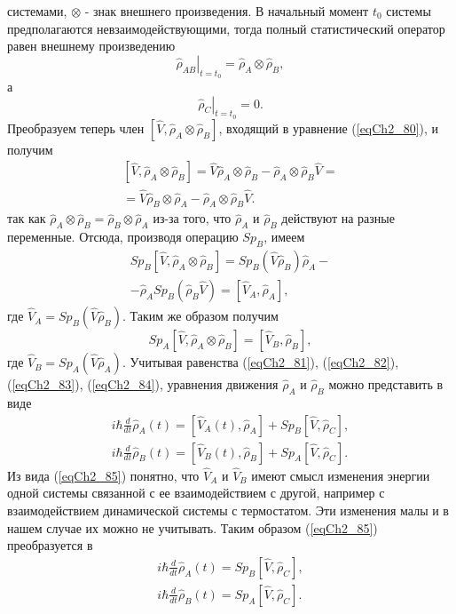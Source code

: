 системами, $\otimes$ - знак внешнего произведения. В начальный момент $t_0$
системы предполагаются  невзаимодействующими, тогда полный
статистический оператор равен внешнему произведению 
\[
\left.\hat{\rho}_{AB}\right|_{t = t_0} = \hat{\rho}_{A} \otimes \hat{\rho}_{B},
\] 
а 
\[
\left.\hat{\rho}_{C}\right|_{t = t_0} = 0.
\] 
Преобразуем теперь член 
$\left[\hat{V}, \hat{\rho}_{A} \otimes \hat{\rho}_{B}\right]$,
входящий в уравнение (\ref{eqCh2_80}), и получим  
\begin{eqnarray}
\left[\hat{V}, \hat{\rho}_{A} \otimes \hat{\rho}_{B}\right] = 
\hat{V}  \hat{\rho}_{A} \otimes \hat{\rho}_{B} - 
\hat{\rho}_{A} \otimes \hat{\rho}_{B} \hat{V} = 
\nonumber \\
= \hat{V}  \hat{\rho}_{B} \otimes \hat{\rho}_{A} - 
\hat{\rho}_{A} \otimes \hat{\rho}_{B} \hat{V}.
\label{eqCh2_82}
\end{eqnarray}
так как 
\(
\hat{\rho}_{A} \otimes \hat{\rho}_{B} = 
\hat{\rho}_{B} \otimes \hat{\rho}_{A}
\)   из-за того, что  $\hat{\rho}_{A}$ и $\hat{\rho}_{B}$ действуют на
разные  переменные. Отсюда, производя операцию $Sp_B$, имеем 
\begin{eqnarray}
Sp_B \left[\hat{V}, \hat{\rho}_{A} \otimes \hat{\rho}_{B}\right] = 
Sp_B\left(\hat{V} \hat{\rho}_{B}\right) \hat{\rho}_{A} - 
\nonumber \\
-
\hat{\rho}_{A} Sp_B \left(\hat{\rho}_{B} \hat{V}\right) = 
\left[\hat{V}_A, \hat{\rho}_A\right],
\label{eqCh2_83}
\end{eqnarray}
где $\hat{V}_A = Sp_B\left(\hat{V}\hat{\rho}_B\right)$. Таким же
образом получим 
\begin{equation}
Sp_A \left[\hat{V}, \hat{\rho}_{A} \otimes \hat{\rho}_{B}\right] =
\left[\hat{V}_B, \hat{\rho}_B\right],
\label{eqCh2_84}
\end{equation}
где $\hat{V}_B= Sp_A\left(\hat{V}\hat{\rho}_A\right)$.  
Учитывая равенства (\ref{eqCh2_81}), (\ref{eqCh2_82}),
(\ref{eqCh2_83}), (\ref{eqCh2_84}), уравнения движения 
$\hat{\rho}_{A}$ и $\hat{\rho}_{B}$ можно представить в виде  
\begin{eqnarray}
i\hbar\frac{d}{d t} \hat{\rho}_A\left(t\right) = 
\left[\hat{V}_A\left(t\right), \hat{\rho}_A\right] +
Sp_B \left[\hat{V}, \hat{\rho}_C\right],
\nonumber \\
i\hbar\frac{d}{d t} \hat{\rho}_B\left(t\right) = 
\left[\hat{V}_B\left(t\right), \hat{\rho}_B\right] +
Sp_A \left[\hat{V}, \hat{\rho}_C\right].
\label{eqCh2_85}
\end{eqnarray}
Из вида (\ref{eqCh2_85}) понятно, что $\hat{V}_A$ и $\hat{V}_B$ имеют
смысл изменения энергии одной системы связанной с ее взаимодействием с
другой, например с взаимодействием динамической системы с
термостатом. Эти изменения малы и в нашем случае их можно не
учитывать. Таким образом (\ref{eqCh2_85}) преобразуется в 
\begin{eqnarray}
i\hbar\frac{d}{d t} \hat{\rho}_A\left(t\right) = 
Sp_B \left[\hat{V}, \hat{\rho}_C\right],
\nonumber \\
i\hbar\frac{d}{d t} \hat{\rho}_B\left(t\right) = 
Sp_A \left[\hat{V}, \hat{\rho}_C\right].
\label{eqCh2_85a}
\end{eqnarray}

